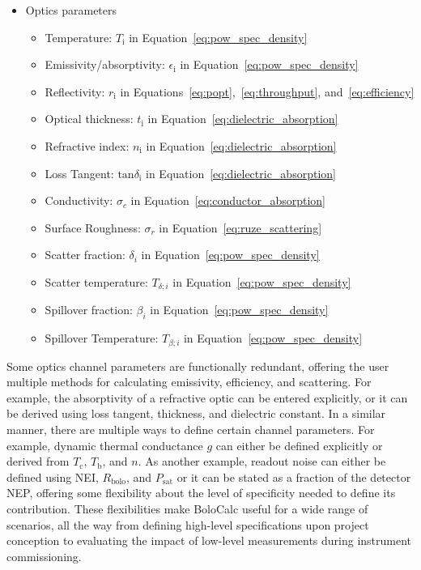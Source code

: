 \begin{itemize}
\begin{itemize}
        \end{itemize}
    \item Optics parameters
        \begin{itemize}
        \item Temperature: $T_{\mathrm{i}}$ in Equation~\ref{eq:pow_spec_density}
        \item Emissivity/absorptivity: $\epsilon_{\mathrm{i}}$ in Equation~\ref{eq:pow_spec_density}
        \item Reflectivity: $r_{\mathrm{i}}$ in Equations~\ref{eq:popt},~\ref{eq:throughput}, and~\ref{eq:efficiency}
        \item Optical thickness: $t_{\mathrm{i}}$ in Equation~\ref{eq:dielectric_absorption}
        \item Refractive index: $n_{\mathrm{i}}$ in Equation~\ref{eq:dielectric_absorption}
        \item Loss Tangent: $\mathrm{tan} \delta_{\mathrm{i}}$ in Equation~\ref{eq:dielectric_absorption}
        \item Conductivity: $\sigma_{c}$ in Equation~\ref{eq:conductor_absorption}
        \item Surface Roughness: $\sigma_{r}$ in Equation~\ref{eq:ruze_scattering}
        \item Scatter fraction: $\delta_{i}$ in Equation~\ref{eq:pow_spec_density}
        \item Scatter temperature: $T_{\delta ; i}$ in Equation~\ref{eq:pow_spec_density}
        \item Spillover fraction: $\beta_{i}$ in Equation~\ref{eq:pow_spec_density}
        \item Spillover Temperature: $T_{\beta ; i}$ in Equation~\ref{eq:pow_spec_density}
        \end{itemize}
\end{itemize}
Some optics channel parameters are functionally redundant, offering the user multiple methods for calculating emissivity, efficiency, and scattering. For example, the absorptivity of a refractive optic can be entered explicitly, or it can be derived using loss tangent, thickness, and dielectric constant. In a similar manner, there are multiple ways to define certain channel parameters. For example, dynamic thermal conductance $g$ can either be defined explicitly or derived from $T_{\mathrm{c}}$, $T_{\mathrm{b}}$, and $n$. As another example, readout noise can either be defined using NEI, $R_{\mathrm{bolo}}$, and $P_{\mathrm{sat}}$ or it can be stated as a fraction of the detector NEP, offering some flexibility about the level of specificity needed to define its contribution. These flexibilities make BoloCalc useful for a wide range of scenarios, all the way from defining high-level specifications upon project conception to evaluating the impact of low-level measurements during instrument commissioning.

